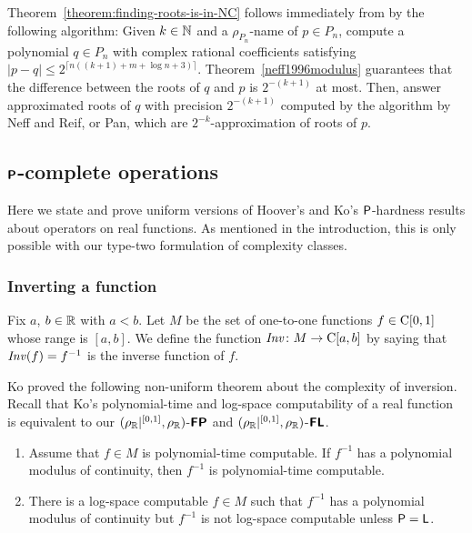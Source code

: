 \documentclass[envcountsect,envcountsame,orivec,oribibl]{llncs}
\begin{document}

Theorem~\ref{theorem:finding-roots-is-in-NC} follows immediately from
by the following algorithm:
Given $k \in \mathbb N$ and a $\rho_{P_n}$-name of $p \in P_n$, 
compute a polynomial $q \in {P_n}$ with complex rational coefficients
satisfying $|p - q| \le 2^{\lceil n((k+1) + m + \log n + 3)\rceil}$.
Theorem~\ref{neff1996modulus} guarantees that the difference between 
the roots of $q$ and $p$ is $2^{-(k+1)}$ at most.
Then, answer approximated roots of $q$ with precision $2^{-(k+1)}$ 
computed by the algorithm by Neff and Reif, or Pan,
which are $2^{-k}$-approximation of roots of $p$.

\subsection{$\text{\bfseries \sffamily \upshape P}$-complete operations}
\label{section:P-complete}

Here we state and prove uniform versions of 
Hoover's and Ko's $\mathsf{P}$-hardness results 
about operators on real functions. 
As mentioned in the introduction, 
this is only possible with our type-two formulation of complexity classes. 

\subsubsection{Inverting a function}

Fix $a$, $b \in \mathbb R$ with $a < b$. 
Let $M$ be the set of one-to-one functions $f \in \mathrm C[0,1]$
whose range is $[a,b]$.
We define the function $\mathit{Inv} \colon M \to \mathrm C [a, b]$ 
by saying that $\mathit{Inv} (f) = f ^{-1}$ is the inverse function of $f$. 

Ko proved the following non-uniform theorem about the complexity of inversion.
Recall that Ko's polynomial-time and log-space computability of a real function
is equivalent to our $(\rho _\mathbb R|^{[0,1]}, \rho _\mathbb R)$-$\text{\bfseries \sffamily \upshape FP}$ and $(\rho _\mathbb R|^{[0,1]}, \rho _\mathbb R)$-$\text{\bfseries \sffamily \upshape FL}$. 

\begin{theorem}
\label{theorem: ko inversion}
\begin{enumerate}
\item \label{enumi:ko1991-4.7}
Assume that $f \in M$ is polynomial-time computable. 
If $f^{-1}$ has a polynomial modulus of continuity, 
then $f^{-1}$ is polynomial-time computable.
\item \label{enumi:ko1991-4.18}
There is a log-space computable $f \in M$
such that $f^{-1}$ has a polynomial modulus of continuity
but $f^{-1}$ is not log-space computable
unless $\mathsf{P} = \mathsf{L}$.
\end{enumerate}
\end{theorem}
\end{document}
